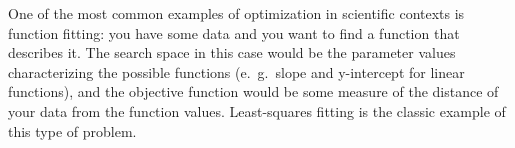 \documentclass{article}
\begin{document}
	One of the most common examples of optimization in scientific contexts
	is function fitting: you have some data and you want to find a function that
	describes it. The search space in this case would be the parameter values
	characterizing the possible functions 
	(e.\ g.\ slope and y-intercept for linear functions), 
	and the objective function
	would be some measure of the distance of your data from the function values.
	Least-squares fitting is the classic example of this type of problem.

% 	
% 
% 
% 
\end{document}
